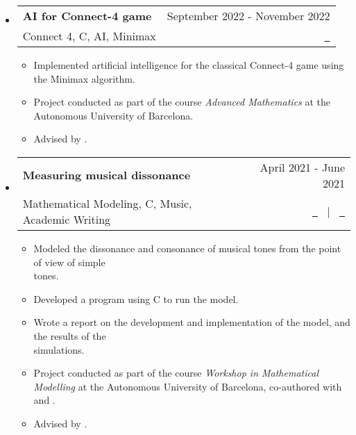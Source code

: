 \documentclass[a4paper,11pt]{article}
\makeatletter
\newcommand{\resumeQuadHeading}[4]{
  \item
  \begin{tabular*}{0.96\textwidth}[t]{l@{\extracolsep{\fill}}r}
    \textbf{#1} & \small #2 \\
    \small#3 & \small #4 \\
  \end{tabular*}
}
\newcommand{\resumeHeadingListStart}{
  \begin{itemize}[leftmargin=0.15in, label={}]
}
\newcommand{\resumeHeadingListEnd}{\end{itemize}}
\makeatother
\begin{document}
\begin{itemize}[leftmargin=3em, itemsep=0.1em, topsep=2pt]
\resumeHeadingListStart{}
\resumeQuadHeading{AI for Connect-4 game}{September 2022 - November 2022}{Connect 4, C, AI, Minimax}{\href{https://github.com/victorballester7/connect4}{\faGithub \ \graydotuline{Code}}}
\begin{itemize}[leftmargin=3em, itemsep=0.1em, topsep=2pt]
	\item \small Implemented artificial intelligence for the classical Connect-4 game using the Minimax algorithm.
	\item \small Project conducted as part of the course \textit{Advanced Mathematics} at the Autonomous University of Barcelona.
	\item \small Advised by \href{https://portalrecerca.uab.cat/en/persons/vicente-soler-ruz}{}.
\end{itemize}
\resumeHeadingListEnd{}

\resumeHeadingListStart{}
\resumeQuadHeading{Measuring musical dissonance}{April 2021 - June 2021}{Mathematical Modeling, C, Music, Academic Writing}{\href{https://github.com/victorballester7/dissonance/blob/main/latex/main.pdf}{\faFileTextO \ \graydotuline{{Report \scriptsize (in Catalan)}}} \ $|$ \ \href{https://github.com/victorballester7/dissonance}{\faGithub \ \graydotuline{Code}}}
\begin{itemize}[leftmargin=3em, itemsep=0.1em, topsep=2pt]
	\item \small Modeled the dissonance and consonance of musical tones from the point of view of simple\\ tones.
	\item \small Developed a program using C to run the model.
	\item \small Wrote a report on the development and implementation of the model, and the results of the\\ simulations.
	\item \small Project conducted as part of the course \textit{Workshop in Mathematical Modelling} at the Autonomous University of Barcelona, co-authored with \href{https://github.com/Oriolbosg}{} and \href{https://github.com/carlosala}{}.
	\item \small Advised by \href{https://mat.uab.cat/departament/uab/pop_ex.php?id=208&lang=}{}.
\end{itemize}
\resumeHeadingListEnd{}


\end{itemize}
\end{document}
